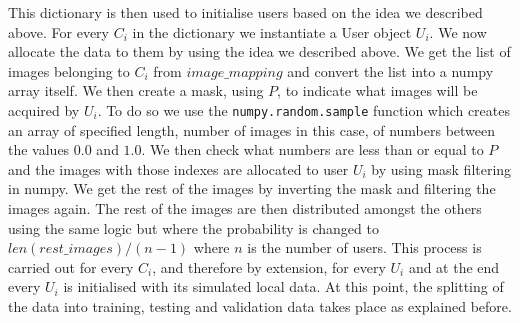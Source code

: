 \documentclass[12pt]{article}
\begin{document}
This dictionary is then used to initialise users based on the idea we described above. For every $C_i$ in the dictionary we instantiate a User object $U_i$. We now allocate the data to them by using the idea we described above. We get the list of images belonging to $C_i$ from $image\_mapping$ and convert the list into a numpy array itself. We then create a mask, using $P$, to indicate what images will be acquired by $U_i$. To do so we use the \texttt{numpy.random.sample} function which creates an array of specified length, number of images in this case, of numbers between the values $0.0$ and $1.0$. We then check what numbers are less than or equal to $P$ and the images with those indexes are allocated to user $U_i$ by using mask filtering in numpy. We get the rest of the images by inverting the mask and filtering the images again. The rest of the images are then distributed amongst the others using the same logic but where the probability is changed to $len(rest\_images)/(n-1)$ where $n$ is the number of users. This process is carried out for every $C_i$, and therefore by extension, for every $U_i$ and at the end every $U_i$ is initialised with its simulated local data. At this point, the splitting of the data into training, testing and validation data takes place as explained before. 
\end{document}
